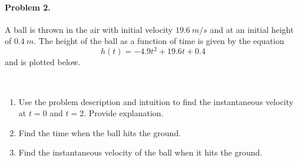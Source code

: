 \documentclass{article}
\begin{document}
\paragraph*{Problem 2.}	A ball is thrown in the air with initial velocity $19.6~m/s$ and at an initial height of $0.4~m$. The height of the ball as a function of time is given by the equation
\[
h(t)=-4.9t^2+19.6t+0.4
\]
and is plotted below.
\begin{figure}[h]
\centering
{}
\end{figure}~\\

\begin{enumerate}[(i.)]
\item	 Use the problem description and intuition to find the instantaneous velocity at $t=0$ and $t=2$. Provide explanation.
\item	Find the time when the ball hits the ground.
\item	Find the instantaneous velocity of the ball when it hits the ground. 
\end{enumerate}
\end{document}
